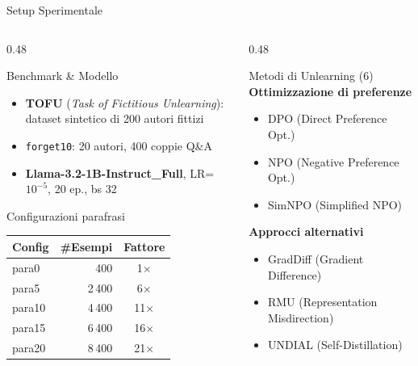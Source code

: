 \documentclass[aspectratio=169,11pt]{beamer}
\begin{document}
\begin{frame}{Setup Sperimentale}
  \vspace{-0.5em}
  \begin{columns}[T]
    \begin{column}{0.48\textwidth}
      \begin{block}{Benchmark \& Modello}
        \scriptsize
        \begin{itemize}\setlength{\itemsep}{0pt}
          \item \textbf{TOFU} (\textit{Task of Fictitious Unlearning}):
                dataset sintetico di 200 autori fittizi
          \item \texttt{forget10}: 20 autori, 400 coppie Q\&A
          \item \textbf{Llama-3.2-1B-Instruct\_Full}, LR=$10^{-5}$, 20 ep., bs 32
        \end{itemize}
      \end{block}
      \vspace{-0.1em}
      \begin{block}{Configurazioni parafrasi}
        \centering
        \scriptsize
        \begin{tabular}{lrc}
          \toprule
          Config & \#Esempi & Fattore \\
          \midrule
          para0  & 400   & 1$\times$ \\
          para5  & 2\,400 & 6$\times$ \\
          para10 & 4\,400 & 11$\times$ \\
          para15 & 6\,400 & 16$\times$ \\
          para20 & 8\,400 & 21$\times$ \\
          \bottomrule
        \end{tabular}
      \end{block}
    \end{column}
    \begin{column}{0.48\textwidth}
      \begin{block}{Metodi di Unlearning (6)}
        \small
        \textbf{Ottimizzazione di preferenze}
        \begin{itemize}\setlength{\itemsep}{1pt}
          \item DPO (Direct Preference Opt.)
          \item NPO (Negative Preference Opt.)
          \item SimNPO (Simplified NPO)
        \end{itemize}
        \textbf{Approcci alternativi}
        \begin{itemize}\setlength{\itemsep}{1pt}
          \item GradDiff (Gradient Difference)
          \item RMU (Representation Misdirection)
          \item UNDIAL (Self-Distillation)
        \end{itemize}
      \end{block}
    \end{column}
  \end{columns}
\end{frame}
\end{document}

